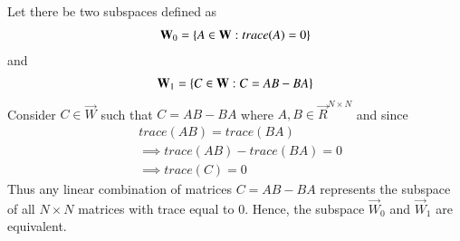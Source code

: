 Let there be two subspaces defined as
\begin{align}
	\mathbf{W}_0=\left\{A \in \mathbf{W} : trace(A)=0\right\}
\end{align}
and
\begin{align}
	\mathbf{W}_1=\left\{C \in \mathbf{W} : C=AB-BA\right\}
\end{align}
Consider $C \in \vec{W}$ such that $C=AB-BA$ where $A,B \in \vec{R}^{N\times N}$ and since 
\begin{align}
	&trace(AB)=trace(BA)\\
	&\implies trace(AB)-trace(BA)=0\\
	&\implies trace(C)=0
\end{align}
Thus any linear combination of matrices $C=AB-BA$ represents the subspace of all $N\times N$ matrices  with trace equal to 0. Hence, the subspace $\vec{W}_0$ and $\vec{W}_1$ are equivalent.

